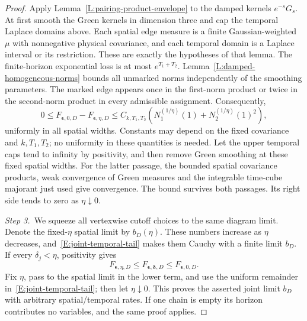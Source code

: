 \documentclass[12pt,oneside,openany]{book}
\numberwithin{equation}{section}
\theoremstyle{nogostyle}
\theoremstyle{definition}
\begin{document}
\begin{proof}
  Apply Lemma~\ref{L:pairing-product-envelope} to the damped kernels
  $e^{-s}G_s$. At first smooth the Green kernels in dimension three and cap the
  temporal Laplace domains above. Each spatial edge measure is a finite
  Gaussian-weighted $\mu$ with nonnegative physical covariance, and each
  temporal domain is a Laplace interval or its restriction. These are exactly
  the hypotheses of that lemma. The finite-horizon exponential loss is at most
  $e^{T_1+T_2}$. Lemma~\ref{L:damped-homogeneous-norms} bounds all unmarked
  norms independently of the smoothing parameters. The marked edge appears once
  in the first-norm product or twice in the second-norm product in every
  admissible assignment. Consequently,
  \begin{equation}\label{E:joint-temporal-tail}
    0\le F_{\boldsymbol\epsilon,0,D}
    -F_{\boldsymbol\epsilon,\eta,D}
    \le C_{k,T_1,T_2}
    \left(N_1^{(1/\eta)}(1)+N_2^{(1/\eta)}(1)^2\right),
  \end{equation}
  uniformly in all spatial widths. Constants may depend on the fixed covariance
  and $k,T_1,T_2$; no uniformity in these quantities is needed. Let the upper
  temporal caps tend to infinity by positivity, and then remove Green smoothing
  at these fixed spatial widths. For the latter passage, the bounded spatial
  covariance products, weak convergence of Green measures and the integrable
  time-cube majorant just used give convergence. The bound survives both
  passages. Its right side tends to zero as $\eta\downarrow0$.


  \medskip
  \noindent\textit{Step 3.~}We squeeze all vertexwise cutoff choices to the
  same diagram limit.
  Denote the fixed-$\eta$ spatial limit by $b_D(\eta)$. These numbers increase
  as $\eta$ decreases, and~\eqref{E:joint-temporal-tail} makes them Cauchy with
  a finite limit $b_D$. If every $\delta_j < \eta$, positivity gives
  \[
    F_{\boldsymbol\epsilon,\eta,D}
    \le F_{\boldsymbol\epsilon,\boldsymbol\delta,D}
    \le F_{\boldsymbol\epsilon,0,D}.
  \]
  Fix $\eta$, pass to the spatial limit in the lower term, and use the uniform
  remainder in~\eqref{E:joint-temporal-tail}; then let $\eta\downarrow0$. This
  proves the asserted joint limit $b_D$ with arbitrary spatial/temporal rates.
  If one chain is empty its horizon contributes no variables, and the same proof
  applies.



\end{proof}
\end{document}
